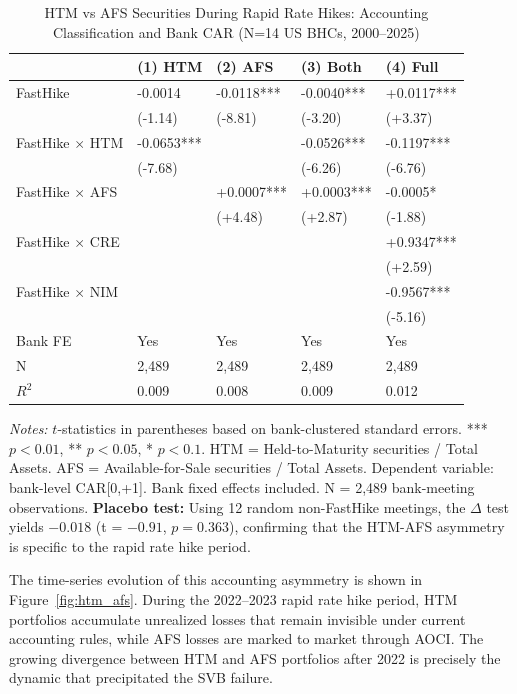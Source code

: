 \documentclass[12pt,a4paper]{article}
\begin{document}
\begin{table}[H]
\centering
\caption{HTM vs AFS Securities During Rapid Rate Hikes: Accounting Classification and Bank CAR (N=14 US BHCs, 2000--2025)}
\label{tab:htm_afs}
\small
\begin{tabular}{lllll}
\toprule
 & (1) HTM & (2) AFS & (3) Both & (4) Full \\
\midrule
FastHike & -0.0014 & -0.0118*** & -0.0040*** & +0.0117*** \\
 & (-1.14) & (-8.81) & (-3.20) & (+3.37) \\
FastHike $\times$  HTM & -0.0653*** &  & -0.0526*** & -0.1197*** \\
 & (-7.68) &  & (-6.26) & (-6.76) \\
FastHike $\times$  AFS &  & +0.0007*** & +0.0003*** & -0.0005* \\
 &  & (+4.48) & (+2.87) & (-1.88) \\
FastHike $\times$  CRE &  &  &  & +0.9347*** \\
 &  &  &  & (+2.59) \\
FastHike $\times$  NIM &  &  &  & -0.9567*** \\
 &  &  &  & (-5.16) \\
Bank FE & Yes & Yes & Yes & Yes \\
N & 2,489 & 2,489 & 2,489 & 2,489 \\
$R^2$ & 0.009 & 0.008 & 0.009 & 0.012 \\
\bottomrule
\end{tabular}
\end{table}
\noindent\textit{Notes:} $t$-statistics in parentheses based on bank-clustered standard errors. *** $p<0.01$, ** $p<0.05$, * $p<0.1$. HTM = Held-to-Maturity securities / Total Assets. AFS = Available-for-Sale securities / Total Assets. Dependent variable: bank-level CAR[0,+1]. Bank fixed effects included. N = 2,489 bank-meeting observations. \textbf{Placebo test:} Using 12 random non-FastHike meetings, the $\Delta$ test yields $-0.018$ (t = $-0.91$, $p = 0.363$), confirming that the HTM-AFS asymmetry is specific to the rapid rate hike period.

The time-series evolution of this accounting asymmetry is shown in Figure~\ref{fig:htm_afs}. During the 2022--2023 rapid rate hike period, HTM portfolios accumulate unrealized losses that remain invisible under current accounting rules, while AFS losses are marked to market through AOCI. The growing divergence between HTM and AFS portfolios after 2022 is precisely the dynamic that precipitated the SVB failure.
\end{document}

